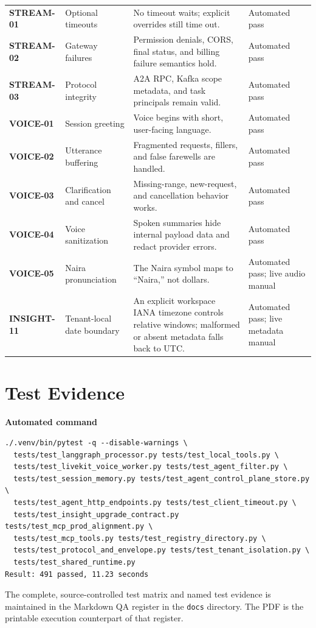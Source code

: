 \documentclass[10pt]{article}
\begin{document}
\begin{longtable}{@{}>{\bfseries\color{navy}}p{}@{\hspace{0.7em}} p{}@{\hspace{0.7em}} p{}@{\hspace{0.7em}} p{}@{}}
STREAM-01 & Optional timeouts & No timeout waits; explicit overrides still time out. & Automated pass \\
STREAM-02 & Gateway failures & Permission denials, CORS, final status, and billing failure semantics hold. & Automated pass \\
STREAM-03 & Protocol integrity & A2A RPC, Kafka scope metadata, and task principals remain valid. & Automated pass \\
VOICE-01 & Session greeting & Voice begins with short, user-facing language. & Automated pass \\
VOICE-02 & Utterance buffering & Fragmented requests, fillers, and false farewells are handled. & Automated pass \\
VOICE-03 & Clarification and cancel & Missing-range, new-request, and cancellation behavior works. & Automated pass \\
VOICE-04 & Voice sanitization & Spoken summaries hide internal payload data and redact provider errors. & Automated pass \\
VOICE-05 & Naira pronunciation & The Naira symbol maps to ``Naira,'' not dollars. & Automated pass; live audio manual \\
INSIGHT-11 & Tenant-local date boundary & An explicit workspace IANA timezone controls relative windows; malformed or absent metadata falls back to UTC. & Automated pass; live metadata manual \\
\bottomrule
\end{longtable}
\normalsize
\clearpage

\section{Test Evidence}
\textbf{Automated command}
\begin{verbatim}
./.venv/bin/pytest -q --disable-warnings \
  tests/test_langgraph_processor.py tests/test_local_tools.py \
  tests/test_livekit_voice_worker.py tests/test_agent_filter.py \
  tests/test_session_memory.py tests/test_agent_control_plane_store.py \
  tests/test_agent_http_endpoints.py tests/test_client_timeout.py \
  tests/test_insight_upgrade_contract.py tests/test_mcp_prod_alignment.py \
  tests/test_mcp_tools.py tests/test_registry_directory.py \
  tests/test_protocol_and_envelope.py tests/test_tenant_isolation.py \
  tests/test_shared_runtime.py
Result: 491 passed, 11.23 seconds
\end{verbatim}

The complete, source-controlled test matrix and named test evidence is maintained in the Markdown QA register in the \texttt{docs} directory. The PDF is the printable execution counterpart of that register.
\end{document}
